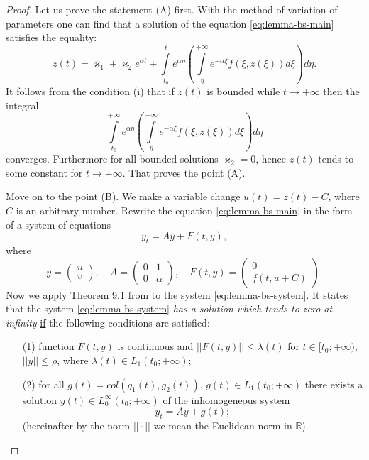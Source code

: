 \begin{proof}
	Let us prove the statement (A) first.
	With the method of variation of parameters one can find that a solution of the equation \eqref{eq:lemma-bs-main} satisfies the equality:
	\begin{equation}
		z(t) = \varkappa_1 + \varkappa_2 e^{\alpha t} + \int \limits_{t_0}^{t} e^{\alpha \eta} \left( \int \limits_{\eta}^{+\infty} e^{-\alpha \xi} f(\xi, z(\xi)) d\xi \right) d\eta.
	\end{equation}
	It follows from the condition (i) that if $z(t)$ is bounded while $t \to +\infty$ then the integral
	\begin{equation}
		\int \limits_{t_0}^{+\infty} e^{\alpha \eta} \left( \int \limits_{\eta}^{+\infty} e^{-\alpha \xi} f(\xi, z(\xi)) d\xi \right) d\eta
	\end{equation}
	converges.
	Furthermore for all bounded solutions $\varkappa_2 = 0$, hence $z(t)$ tends to some constant for $t \to +\infty$.
	That proves the point (A).
	
	Move on to the point (B).
	We make a variable change $u(t) = z(t) - C$, where $C$ is an arbitrary number.
	Rewrite the equation \eqref{eq:lemma-bs-main} in the form of a system of equations
	\begin{equation}
		y_t = Ay + F(t, y),
		\label{eq:lemma-bs-system}	
	\end{equation}
	where
	\begin{equation*}
		y = \begin{pmatrix}
			u \\ v
		\end{pmatrix}, \quad
		A = \begin{pmatrix}
			0 & 1 \\
			0 & \alpha
		\end{pmatrix}, \quad
		F(t, y) = \begin{pmatrix}
			0 \\ f(t, u + C)
		\end{pmatrix}.
	\end{equation*}
	Now we apply Theorem 9.1 from \cite[Chapter XII]{Hartman} to the system \eqref{eq:lemma-bs-system}.
	It states that the system \eqref{eq:lemma-bs-system} {\it has a solution which tends to zero at infinity} \underline{if} the following conditions are satisfied:
	\begin{itemize}
		\item[(1)] function $F(t, y)$ is continuous and $||F(t, y)|| \le \lambda(t)$ for $t \in [t_0; +\infty)$, $||y|| \le \rho$, where $\lambda(t) \in L_1(t_0; +\infty)$;
		\item[(2)] for all $g(t) = col(g_1(t), g_2(t))$, $g(t) \in L_1(t_0; +\infty)$ there exists a solution $y(t) \in L_0^{\infty}(t_0; +\infty)$ of the inhomogeneous system
		\begin{equation}
			y_t = Ay + g(t);
			\label{eq:lemma-bs-hartman}
		\end{equation}
		(hereinafter by the norm $||\cdot||$ we mean the Euclidean norm in $\mathbb{R}$).
	\end{itemize}
	

\end{proof}
